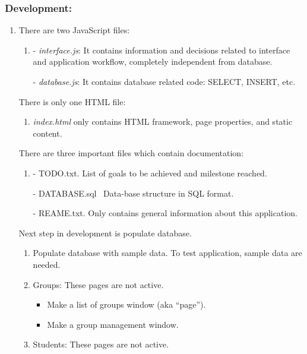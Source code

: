 \documentclass[a4paper]{article}
\begin{document}
\bigskip


\bigskip


\bigskip


\bigskip


\bigskip


\bigskip


\bigskip


\bigskip

\clearpage\subsubsection[Development:]{Development:}
\hypertarget{RefHeading146541801272074}{}\begin{enumerate}
\item[] There are two JavaScript files:

\begin{enumerate}
\item[] {}- \textit{interface.js}: It contains information and decisions
related to interface and application workflow, completely independent
from database.

{}- \textit{database.js}: It contains database related code: SELECT,
INSERT, etc. 
\end{enumerate}
There is only one HTML file:

\begin{enumerate}
\item[] \textit{index.html} only contains HTML framework, page
properties, and static content. \ 
\end{enumerate}
There are three important files which contain documentation:

\begin{enumerate}
\item[] {}- TODO.txt. List of goals to be achieved and milestone
reached.

{}- DATABASE.sql \ Data-base structure in SQL format.

{}- REAME.txt. Only contains general information about this application.
\end{enumerate}
Next step in development is populate database.

\begin{enumerate}
\item Populate database with sample data. To test application, sample
data are needed. 
\item Groups: These pages are not active.

\begin{itemize}
\item Make a list of groups window (aka “page”).
\item Make a group management window.
\end{itemize}
\item Students: These pages are not active.


\end{enumerate}
\end{enumerate}
\end{document}
